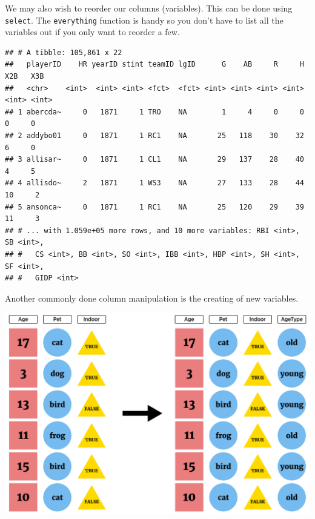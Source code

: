 \documentclass[
]{book}
\newenvironment{Shaded}{\begin{snugshade}}{\end{snugshade}}
\newcommand{\KeywordTok}[1]{\textcolor[rgb]{0.13,0.29,0.53}{\textbf{#1}}}
\newcommand{\NormalTok}[1]{#1}
\newcommand{\OperatorTok}[1]{\textcolor[rgb]{0.81,0.36,0.00}{\textbf{#1}}}
\newcommand{\StringTok}[1]{\textcolor[rgb]{0.31,0.60,0.02}{#1}}
\theoremstyle{definition}
\theoremstyle{definition}
\theoremstyle{definition}
\theoremstyle{remark}
\begin{document}
We may also wish to reorder our columns (variables). This can be done using \texttt{select}. The \texttt{everything} function is handy so you don't have to list all the variables out if you only want to reorder a few.

\begin{Shaded}
\end{Shaded}

\begin{verbatim}
## # A tibble: 105,861 x 22
##   playerID    HR yearID stint teamID lgID      G    AB     R     H   X2B   X3B
##   <chr>    <int>  <int> <int> <fct>  <fct> <int> <int> <int> <int> <int> <int>
## 1 abercda~     0   1871     1 TRO    NA        1     4     0     0     0     0
## 2 addybo01     0   1871     1 RC1    NA       25   118    30    32     6     0
## 3 allisar~     0   1871     1 CL1    NA       29   137    28    40     4     5
## 4 allisdo~     2   1871     1 WS3    NA       27   133    28    44    10     2
## 5 ansonca~     0   1871     1 RC1    NA       25   120    29    39    11     3
## # ... with 1.059e+05 more rows, and 10 more variables: RBI <int>, SB <int>,
## #   CS <int>, BB <int>, SO <int>, IBB <int>, HBP <int>, SH <int>, SF <int>,
## #   GIDP <int>
\end{verbatim}

Another commonly done column manipulation is the creating of new variables.

\begin{center}\includegraphics[width=0.8\linewidth]{img/createVarVisualF} \end{center}
\end{document}
